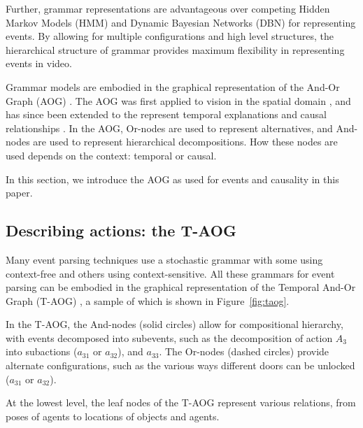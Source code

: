 \documentclass[10pt,journal,letterpaper,compsoc]{IEEEtran}
\begin{document}
Further, grammar representations are advantageous over competing Hidden Markov Models (HMM) and Dynamic Bayesian Networks (DBN) for representing events.  By allowing for multiple configurations and high level structures, the hierarchical structure of grammar provides maximum flexibility in representing events in video.    


Grammar models are embodied in the graphical representation of the And-Or Graph (AOG) \cite{HeuristicSearch}.  The AOG was first applied to vision in the spatial domain \cite{StochasticGrammar}, and has since been extended to the represent temporal explanations \cite{Mingtao} and causal relationships \cite{morrow2012pami}.  In the AOG, Or-nodes are used to represent alternatives, and And-nodes are used to represent hierarchical decompositions.  How these nodes are used depends on the context: temporal or causal.

In this section, we introduce the AOG as used for events and causality in this paper.


\subsection{Describing actions: the T-AOG}




Many event parsing techniques use a stochastic grammar with some using context-free and others using context-sensitive.   All these grammars for event parsing can be embodied in the graphical representation of the Temporal And-Or Graph (T-AOG) \cite{Mingtao}, a sample of which is shown in Figure~\ref{fig:taog}.  

In the T-AOG, the And-nodes (solid circles) allow for compositional hierarchy, with events decomposed into subevents, such as the decomposition of action $A_{3}$ into subactions ($a_{31}$ or $a_{32}$), and $a_{33}$.  The Or-nodes (dashed circles) provide alternate configurations, such as the various ways different doors can be unlocked ($a_{31}$ or $a_{32}$).  

At the lowest level, the leaf nodes of the T-AOG represent various relations, from poses of agents to locations of objects and agents.
\end{document}
